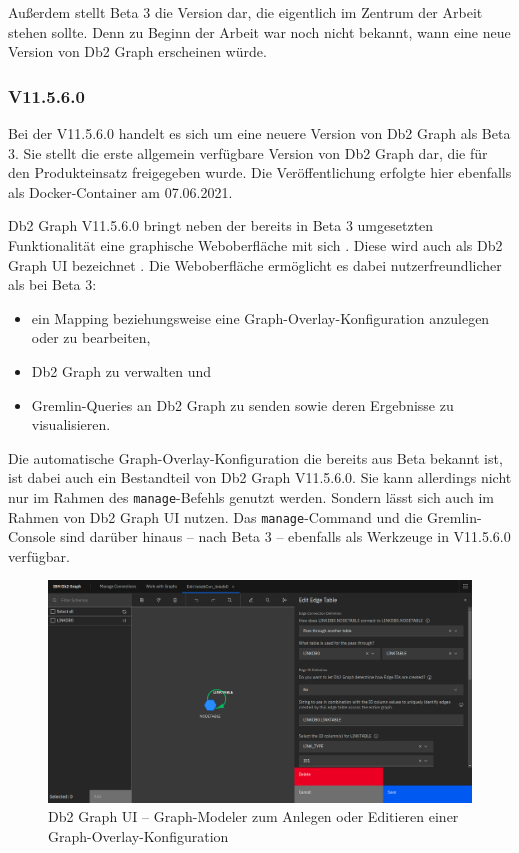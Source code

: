Außerdem stellt Beta 3 die Version dar, die eigentlich im Zentrum der Arbeit stehen sollte. Denn zu Beginn der Arbeit war noch nicht bekannt, wann eine neue Version von Db2 Graph erscheinen würde. 

\subsubsection{V11.5.6.0}

Bei der V11.5.6.0 handelt es sich um eine neuere Version von Db2 Graph als Beta 3. Sie stellt die erste allgemein verfügbare Version von Db2 Graph dar, die für den Produkteinsatz freigegeben wurde. Die Veröffentlichung erfolgte hier ebenfalls als Docker-Container am 07.06.2021. 

Db2 Graph V11.5.6.0 bringt neben der bereits in Beta 3 umgesetzten Funktionalität eine graphische Weboberfläche mit sich \cite{ibm_docs_db2_graph_ui}. Diese wird auch als Db2 Graph UI bezeichnet \cite{ibm_docs_db2_graph_ui}. Die Weboberfläche ermöglicht es dabei nutzerfreundlicher als bei Beta 3: 

\begin{itemize}
    \item ein Mapping beziehungsweise eine Graph-Overlay-Konfiguration anzulegen oder zu bearbeiten,
    \item Db2 Graph zu verwalten und 
    \item Gremlin-Queries an Db2 Graph zu senden sowie deren Ergebnisse zu visualisieren. 
\end{itemize}

Die automatische Graph-Overlay-Konfiguration die bereits aus Beta bekannt ist, ist dabei auch ein Bestandteil von Db2 Graph V11.5.6.0. Sie kann allerdings nicht nur im Rahmen des \texttt{manage}-Befehls genutzt werden. Sondern lässt sich auch im Rahmen von Db2 Graph UI nutzen. Das \texttt{manage}-Command und die Gremlin-Console sind darüber hinaus -- nach Beta 3 -- ebenfalls als Werkzeuge in V11.5.6.0 verfügbar.

\begin{figure}[ht]
    \centering
    \includegraphics[width=\textwidth]{images/db2_graph_editor.png}
    \vspace{0.1em}
    \caption[Db2 Graph UI -- Graph-Modeler]{Db2 Graph UI -- Graph-Modeler zum Anlegen oder Editieren einer Graph-Overlay-Konfiguration}
    \label{fig:db2_graph_ui_editor}
\end{figure}

